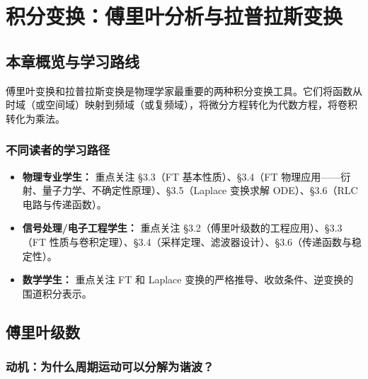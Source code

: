 
\chapter{积分变换：傅里叶分析与拉普拉斯变换}

\section{本章概览与学习路线}

傅里叶变换和拉普拉斯变换是物理学家最重要的两种积分变换工具。它们将函数从时域（或空间域）映射到频域（或复频域），将微分方程转化为代数方程，将卷积转化为乘法。

\begin{center}
\end{center}

\subsection*{不同读者的学习路径}

\begin{itemize}
\item \textbf{物理专业学生：} 重点关注 \S3.3（FT 基本性质）、\S3.4（FT 物理应用——衍射、量子力学、不确定性原理）、\S3.5（Laplace 变换求解 ODE）、\S3.6（RLC 电路与传递函数）。
\item \textbf{信号处理/电子工程学生：} 重点关注 \S3.2（傅里叶级数的工程应用）、\S3.3（FT 性质与卷积定理）、\S3.4（采样定理、滤波器设计）、\S3.6（传递函数与稳定性）。
\item \textbf{数学学生：} 重点关注 FT 和 Laplace 变换的严格推导、收敛条件、逆变换的围道积分表示。
\end{itemize}

\section{傅里叶级数}
\label{sec:fourier_series}

\subsection*{动机：为什么周期运动可以分解为谐波？}

